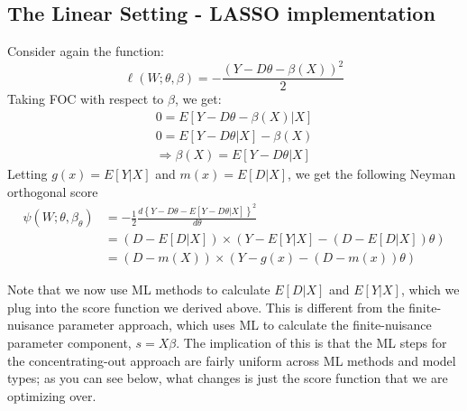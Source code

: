 \documentclass[11pt]{article}
\begin{document}
\subsection{The Linear Setting - LASSO implementation}
Consider again the function:
$$\ell(W ; \theta, \beta)=-\frac{(Y-D \theta-\beta(X))^{2}}{2}$$
Taking FOC with respect to $\beta$, we get:
\begin{align*}
	0 = E[Y - D\theta - \beta(X)| X] \\
  0 = E[Y- D\theta|X] - \beta(X) \\
	\Rightarrow \beta(X) = E[Y - D\theta |X]
\end{align*}
Letting $g(x) = E[Y|X]$ and $m(x) = E[D|X]$, we get the following Neyman orthogonal score
\begin{align*}
	\psi\left(W ; \theta, \beta_{\theta}\right) &=-\frac{1}{2} \frac{d\left\{Y-D \theta-E[Y-D \theta | X]\right\}^{2}}{d \theta} \\
	&=\left(D-E[D | X]\right) \times\left(Y-E[Y | X]-\left(D-E[D | X]\right) \theta\right) \\
	&=\left(D-m(X)\right) \times\left(Y- g(x) - (D - m(x) )\theta\right)
\end{align*}

Note that we now use ML methods to calculate $E[D|X]$ and $E[Y|X]$, which we plug into the score function we derived above. This is different from the finite-nuisance parameter approach, which uses ML to calculate the finite-nuisance parameter component, $s = X\beta$. The implication of this is that the ML steps for the concentrating-out approach are fairly uniform across ML methods and model types; as you can see below, what changes is just the score function that we are optimizing over.
\end{document}
